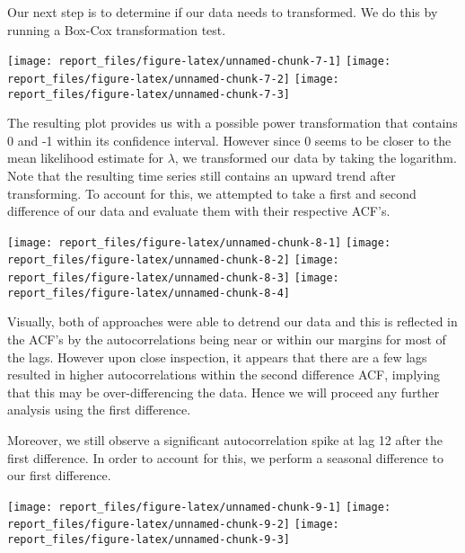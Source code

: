 \documentclass[
]{article}
\begin{document}
Our next step is to determine if our data needs to transformed. We do
this by running a Box-Cox transformation test.

\begin{center}\texttt{[image: report\_files/figure-latex/unnamed-chunk-7-1]} \texttt{[image: report\_files/figure-latex/unnamed-chunk-7-2]} \texttt{[image: report\_files/figure-latex/unnamed-chunk-7-3]} \end{center}

The resulting plot provides us with a possible power transformation that
contains 0 and -1 within its confidence interval. However since 0 seems
to be closer to the mean likelihood estimate for \(\lambda\), we
transformed our data by taking the logarithm. Note that the resulting
time series still contains an upward trend after transforming. To
account for this, we attempted to take a first and second difference of
our data and evaluate them with their respective ACF's.

\begin{center}\texttt{[image: report\_files/figure-latex/unnamed-chunk-8-1]} \texttt{[image: report\_files/figure-latex/unnamed-chunk-8-2]} \texttt{[image: report\_files/figure-latex/unnamed-chunk-8-3]} \texttt{[image: report\_files/figure-latex/unnamed-chunk-8-4]} \end{center}

Visually, both of approaches were able to detrend our data and this is
reflected in the ACF's by the autocorrelations being near or within our
margins for most of the lags. However upon close inspection, it appears
that there are a few lags resulted in higher autocorrelations within the
second difference ACF, implying that this may be over-differencing the
data. Hence we will proceed any further analysis using the first
difference.

Moreover, we still observe a significant autocorrelation spike at lag 12
after the first difference. In order to account for this, we perform a
seasonal difference to our first difference.

\begin{center}\texttt{[image: report\_files/figure-latex/unnamed-chunk-9-1]} \texttt{[image: report\_files/figure-latex/unnamed-chunk-9-2]} \texttt{[image: report\_files/figure-latex/unnamed-chunk-9-3]} \end{center}
\end{document}
